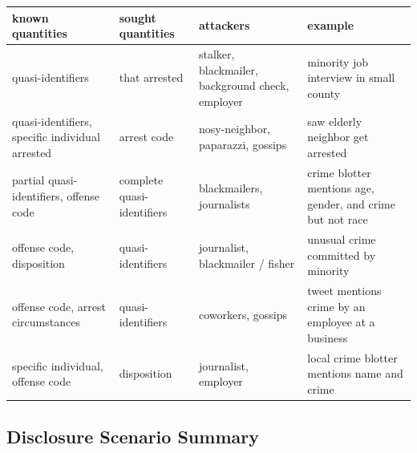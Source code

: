 \documentclass[]{article}
\begin{document}
\begin{center}
  \renewcommand{\arraystretch}{1.25}
   \begin{tabular}{p{86.751pt}p{86.751pt}p{108.439pt}p{130.126pt}}
    \textbf{known quantities} & \textbf{sought quantities} & \textbf{attackers} & \textbf{example} \\ \hline
    quasi-identifiers                               & that arrested              & stalker, blackmailer, background check, employer & minority job interview in small county                     \\
    quasi-identifiers, specific individual arrested & arrest code                & nosy-neighbor, paparazzi, gossips                & saw elderly neighbor get arrested                          \\
    partial quasi-identifiers, offense code         & complete quasi-identifiers & blackmailers, journalists                        & crime blotter mentions age, gender, and crime but not race \\
    offense code, disposition                       & quasi-identifiers          & journalist, blackmailer / fisher                 & unusual crime committed by minority                        \\
    offense code, arrest circumstances              & quasi-identifiers          & coworkers, gossips                               & tweet mentions crime by an employee at a business          \\
    specific individual, offense code               & disposition                & journalist, employer                             & local crime blotter mentions name and crime                \\
  \end{tabular}
  \renewcommand{\arraystretch}{1.0}
\end{center}

\subsection{Disclosure Scenario
Summary}\label{disclosure-scenario-summary}
\end{document}
